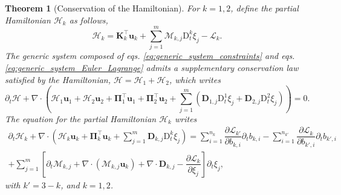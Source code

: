 \documentclass{myclass}
\newtheorem{theorem}{\bf Theorem}[section]
\newcommand{\Lag}{\mathscr{L}}
\newcommand{\Ham}{\mathcal{H}}
\newcommand{\Dt}{\mathrm{D}_t}
\newcommand{\vel}{\bm{u}}
\newcommand{\pth}[1]  {\left( #1 \right)}
\newcommand{\brck}[1]  {\left[ #1 \right]}
\begin{document}
\begin{theorem}[Conservation of the Hamiltonian]\label{thrm:Hamiltonian}
For $k=1,2$, define the partial Hamiltonian $\Ham_k$ as follows,
\begin{equation}\label{eq:generic_partial_hamiltonian_def}
\Ham_k = \bm{K}_k^\top\vel_k + \sum_{j=1}^m \mathscr{M}_{k,j}\Dt^k\xi_j - \Lag_k.
\end{equation}
The generic system composed of eqs. \eqref{eq:generic_system_constraints} and eqs. \eqref {eq:generic_system_Euler_Lagrange} admits a supplementary conservation law satisfied by the Hamiltonian, $\Ham=\Ham_1 + \Ham_2$, which writes
\begin{equation}\label{eq:generic_hamiltonian_eq}
\partial_t\Ham + \nabla\cdot\pth{\Ham_1\vel_1 +  \Ham_2\vel_2 + \bm{\Pi}_1^\top\vel_1 +\bm{\Pi}_2^\top\vel_2 + \sum_{j=1}^m\pth{\bm{D}_{1,j}\Dt^1\xi_j+\bm{D}_{2,j}\Dt^2\xi_j}} = 0.
\end{equation}
The equation for the partial Hamiltonian $\Ham_k$ writes
\begin{multline}\label{eq:generic_partial_hamiltonian_eq}
\partial_t\Ham_k + \nabla\cdot\pth{\Ham_k\vel_k + \bm{\Pi}_k^\top\vel_k+\sum_{j=1}^m\bm{D}_{k,j}\Dt^k\xi_j} = \sum_{i=1}^{n_k}\dfrac{\partial\Lag_{k'}}{\partial b_{k,i}}\partial_t b_{k,i} - \sum_{i=1}^{n_{k'}}\dfrac{\partial\Lag_{k}}{\partial b_{k',i}}\partial_t b_{k',i} \\
+\sum_{j=1}^{m} \brck{\partial_t\mathscr{M}_{k,j}+\nabla\cdot\pth{\mathscr{M}_{k,j}\vel_k} + \nabla\cdot\bm{D}_{k,j} - \dfrac{\partial\Lag_k}{\partial\xi_j}}\partial_t\xi_j,
\end{multline}
with $k'=3-k$, and $k=1,2$.
\end{theorem}
\end{document}

